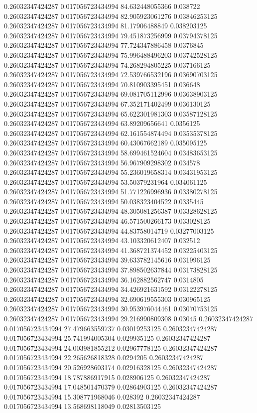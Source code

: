 0.26032347424287 0.017056723434994 84.632448055366 0.038722
0.26032347424287 0.017056723434994 82.905923061276 0.03846253125
0.26032347424287 0.017056723434994 81.17906488849 0.038203125
0.26032347424287 0.017056723434994 79.451873256999 0.03794378125
0.26032347424287 0.017056723434994 77.724347886458 0.0376845
0.26032347424287 0.017056723434994 75.996488496203 0.03742528125
0.26032347424287 0.017056723434994 74.268294805225 0.037166125
0.26032347424287 0.017056723434994 72.539766532196 0.03690703125
0.26032347424287 0.017056723434994 70.810903395451 0.036648
0.26032347424287 0.017056723434994 69.081705112996 0.03638903125
0.26032347424287 0.017056723434994 67.352171402499 0.036130125
0.26032347424287 0.017056723434994 65.622301981303 0.03587128125
0.26032347424287 0.017056723434994 63.89209656641 0.0356125
0.26032347424287 0.017056723434994 62.161554874494 0.03535378125
0.26032347424287 0.017056723434994 60.43067662189 0.035095125
0.26032347424287 0.017056723434994 58.699461524604 0.03483653125
0.26032347424287 0.017056723434994 56.967909298302 0.034578
0.26032347424287 0.017056723434994 55.236019658314 0.03431953125
0.26032347424287 0.017056723434994 53.50379231964 0.034061125
0.26032347424287 0.017056723434994 51.771226996936 0.03380278125
0.26032347424287 0.017056723434994 50.038323404522 0.0335445
0.26032347424287 0.017056723434994 48.305081256387 0.03328628125
0.26032347424287 0.017056723434994 46.571500266173 0.033028125
0.26032347424287 0.017056723434994 44.83758014719 0.03277003125
0.26032347424287 0.017056723434994 43.103320612407 0.032512
0.26032347424287 0.017056723434994 41.368721374452 0.03225403125
0.26032347424287 0.017056723434994 39.633782145616 0.031996125
0.26032347424287 0.017056723434994 37.898502637844 0.03173828125
0.26032347424287 0.017056723434994 36.162882562747 0.0314805
0.26032347424287 0.017056723434994 34.426921631592 0.03122278125
0.26032347424287 0.017056723434994 32.690619555303 0.030965125
0.26032347424287 0.017056723434994 30.953976044461 0.03070753125
0.26032347424287 0.017056723434994 29.216990809308 0.03045
0.26032347424287 0.017056723434994 27.479663559737 0.03019253125
0.26032347424287 0.017056723434994 25.741994005304 0.029935125
0.26032347424287 0.017056723434994 24.003981855212 0.02967778125
0.26032347424287 0.017056723434994 22.265626818328 0.0294205
0.26032347424287 0.017056723434994 20.526928603174 0.02916328125
0.26032347424287 0.017056723434994 18.787886917915 0.028906125
0.26032347424287 0.017056723434994 17.048501470379 0.02864903125
0.26032347424287 0.017056723434994 15.308771968046 0.028392
0.26032347424287 0.017056723434994 13.568698118049 0.02813503125
